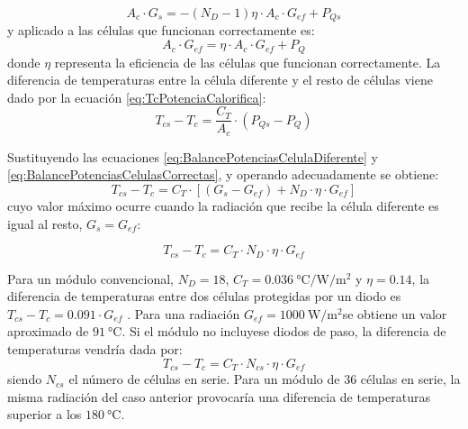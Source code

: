 \begin{equation}
A_{c}\cdot G_{s}=-(N_{D}-1)\eta\cdot A_{c}\cdot G_{ef}+P_{Qs}\label{eq:BalancePotenciasCelulaDiferente}\end{equation}
y aplicado a las células que funcionan correctamente es:\begin{equation}
A_{c}\cdot G_{ef}=\eta\cdot A_{c}\cdot G_{ef}+P_{Q}\label{eq:BalancePotenciasCelulasCorrectas}\end{equation}
donde $\eta$ representa la eficiencia de las células que funcionan
correctamente. La diferencia de temperaturas entre la célula diferente
y el resto de células viene dado por la ecuación  \ref{eq:TcPotenciaCalorifica}:\begin{equation}
T_{cs}-T_{c}=\frac{C_{T}}{A_{c}}\cdot(P_{Qs}-P_{Q})\label{eq:DiferenciaTemperaturas}\end{equation}

Sustituyendo las ecuaciones \ref{eq:BalancePotenciasCelulaDiferente}
y \ref{eq:BalancePotenciasCelulasCorrectas}, y operando adecuadamente
se obtiene:\begin{equation}
T_{cs}-T_{c}=C_{T}\cdot\left[\left(G_{s}-G_{ef}\right)+N_{D}\cdot\eta\cdot G_{ef}\right]\end{equation}
cuyo valor máximo ocurre cuando la radiación que recibe la célula
diferente es igual al resto, $G_{s}=G_{ef}$:

\begin{equation}
T_{cs}-T_{c}=C_{T}\cdot N_{D}\cdot\eta\cdot G_{ef}\label{eq:DiferenciaTemperaturasArreglada}\end{equation}


Para un módulo convencional, $N_{D}=18$, $C_{T}=\SI{0.036}{\celsius\per\watt\per\meter\squared}$
y $\eta=0.14$, la diferencia de temperaturas entre dos células protegidas
por un diodo es $T_{cs}-T_{c}=0.091\cdot G_{ef}$ . Para una radiación
$G_{ef}=\SI{1000}{\watt\per\meter\squared}$se obtiene un valor aproximado
de $\SI{91}{\celsius}$. Si el módulo no incluyese diodos de paso,
la diferencia de temperaturas vendría dada por:\begin{equation}
T_{cs}-T_{c}=C_{T}\cdot N_{cs}\cdot\eta\cdot G_{ef}\label{eq:DiferenciaTemperaturasSinDiodo}\end{equation}
siendo $N_{cs}$ el número de células en serie. Para un módulo de
36 células en serie, la misma radiación del caso anterior provocaría
una diferencia de temperaturas superior a los $\SI{180}{\celsius}$.


